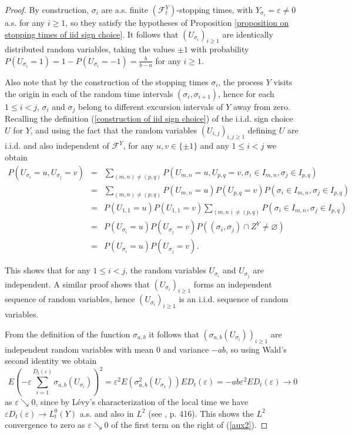 \documentclass[reqno]{amsart}
\theoremstyle{definition}
\theoremstyle{remark}
\numberwithin{equation}{section}
\begin{document}
\begin{proof}
By construction, $\sigma_i$ are a.s. finite $(\mathcal{F}^Y_t)$-stopping times, with $Y_{\sigma_i}=\varepsilon\neq0$ a.s. for any $i\geq1$, so they satisfy the hypotheses of Proposition \ref{proposition on stopping times of iid sign choice}. It follows that $\left( U_{\sigma _{i}}\right) _{i\geq 1}$ are identically distributed random variables, taking the values $\pm 1$ with probability $P\left( U_{\sigma _{i}}=1\right) =1-P\left( U_{\sigma _{i}}=-1\right) =\frac{b}{b-a}$ for any $i\geq 1$.

Also note that by the construction of the stopping times $\sigma_i$, the process $Y$ visits the origin in each of the random time intervals $(\sigma_i, \sigma_{i+1})$, hence for each $1\leq i <j$, $\sigma_i$ and $\sigma_j$ belong to different excursion intervals of $Y$ away from zero. Recalling the definition (\ref{construction of iid sign choice}) of the i.i.d. sign choice $U$ for $Y$, and using the fact that the random variables $(U_{i,j})_{i,j\geq1}$ defining $U$ are i.i.d. and also independent of $\mathcal{F}^ Y$, for any $u,v\in\{\pm1\}$ and any $1\leq i < j$ we obtain
\begin{eqnarray*}
P(U_{\sigma_i}=u, U_{\sigma_j}=v)&=&\sum_{(m,n)\neq (p,q)}P\left(U_{m,n}=u,U_{p,q}=v, \sigma_i\in I_{m,n}, \sigma_j\in I_{p,q}\right)\\
&=&\sum_{(m,n)\neq (p,q)}P(U_{m,n}=u)P(U_{p,q}=v) P(\sigma_i\in I_{m,n}, \sigma_j\in I_{p,q})\\
&=& P(U_{1,1}=u)P(U_{1,1}=v) \sum_{(m,n)\neq (p,q)}P(\sigma_i\in I_{m,n}, \sigma_j\in I_{p,q})\\
&=& P(U_{\sigma_i}=u)P(U_{\sigma_j}=v) P((\sigma_i, \sigma_j) \cap {Z}^Y \neq \varnothing)\\
&=& P(U_{\sigma_i}=u)P(U_{\sigma_j}=v).
\end{eqnarray*}

This shows that for any $1\leq i<j$, the random variables $U_{\sigma_i}$ and $U_{\sigma_j}$ are independent. A similar proof shows that $(U_{\sigma_i})_{i\geq 1}$ forms an independent sequence of random variables, hence $(U_{\sigma_i})_{i\geq 1}$ is an i.i.d. sequence of random variables.


From the definition of the function $\sigma
_{a,b} $ it follows that $\left( \sigma _{a,b}\left( U_{\sigma _{i}}\right)
\right) _{i\geq 1}$ are independent random variables with mean $0$ and
variance $-ab$, so using Wald's second identity we obtain\[
E\left( -\varepsilon \sum_{i=1}^{D_{t}\left( \varepsilon \right) }\sigma
_{a,b}\left( U_{\sigma _{i}}\right) \right) ^{2}=\varepsilon ^{2}E\left(
\sigma _{a,b}^2\left( U_{\sigma _{1}}\right) \right) ED_{t}\left( \varepsilon
\right) =-ab\varepsilon ^{2}ED_{t}\left( \varepsilon \right) \rightarrow 0
\]as $\varepsilon \searrow 0$, since by L\'evy's characterization of the local
time we have $\varepsilon D_{t}\left( \varepsilon \right) \rightarrow
L_{t}^{0}\left( Y\right) $ a.s. and also in $L^{2}$ (see \cite{Karatzas-Shreve}, p. 416). This shows the $L^2$ convergence to zero as $\varepsilon \searrow 0$ of the first term on the right of (\ref{aux2}).


\end{proof}
\end{document}
